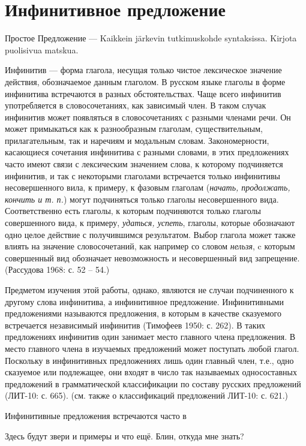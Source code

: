 \section{Инфинитивное предложение}

Простое Предложение --- Kaikkein järkevin tutkimuskohde syntaksissa. Kirjota puolisivua matskua.

Инфинитив --- форма глагола, несущая только чистое лексическое значение действия, обозначаемое данным глаголом. В русском языке глаголы в форме инфинитива встречаются в разных обстоятельствах. Чаще всего инфинитив употребляется в словосочетаниях, как зависимый член. В таком случак инфинитив может появляться в словосочетаниях с разными членами речи. Он может примыкаться как к разнообразным глаголам, существительным, прилагательным, так и наречиям и модальным словам. Закономерности, касающиеся сочетания инфинитива с разными словами, в этих предложениях часто имеют связи с лексическим значением слова, к которому подчиняется инфинитив, и так с некоторыми глаголами встречается только инфинитивы несовершенного вила, к примеру, к фазовым глаголам (\textit{начать, продолжать, кончить и т. п.}) могут подчиняться только глаголы несовершенного вида. Соответственно есть глаголы, к которым подчиняются только глаголы совершенного вида, к примеру, \textit{удаться, успеть}, глаголы, которые обозначают одно целое действие с получившимся результатом. Выбор глагола может также влиять на значение словосочетаний, как например со словом \textit{нельзя}, c которым совершенный вид обозначает невозможность и несовершенный вид запрещение. (Рассудова 1968: с. 52 -- 54.)

Предметом изучения этой работы, однако, являются не случаи подчиненного к другому слова инфинитива, а инфинитивное предложение. Инфинитивными предложениями называются предложения, в которым в качестве сказуемого встречается независимый инфинитив (Тимофеев 1950: с. 262). В таких предложениях инфинитив один занимает место главного члена предложения. В место главного члена в изучаемых предложений может поступать любой глагол. Поскольку в инфинитивных предложениях лишь один главный член, т.е., одно сказуемое или подлежащее, они входят в число так называемых односоставных предложений в грамматической классификации по составу русских предложений (ЛИТ-10: с. 665). (см. также о классификаций предложений ЛИТ-10: с. 621.)

Инфинитивные предложения встречаются часто в 

Здесь будут звери и примеры и что ещё. Блин, откуда мне знать?	




